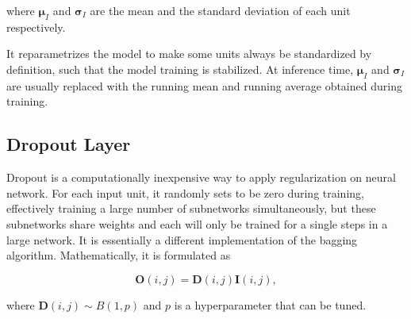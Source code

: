 \documentclass[]{interact}
\theoremstyle{plain}%
\theoremstyle{definition}
\theoremstyle{remark}
\begin{document}
where \(\boldsymbol{\mu}_I\) and \(\boldsymbol{\sigma}_I\) are the mean
and the standard deviation of each unit respectively.

It reparametrizes the model to make some units always be standardized by
definition, such that the model training is stabilized. At inference
time, \(\boldsymbol{\mu}_I\) and \(\boldsymbol{\sigma}_I\) are usually
replaced with the running mean and running average obtained during
training.

\subsection{Dropout Layer}\label{dropout-layer}

Dropout is a computationally inexpensive way to apply regularization on
neural network. For each input unit, it randomly sets to be zero during
training, effectively training a large number of subnetworks
simultaneously, but these subnetworks share weights and each will only
be trained for a single steps in a large network. It is essentially a
different implementation of the bagging algorithm. Mathematically, it is
formulated as

\[\boldsymbol{O}(i,j) = \boldsymbol{D}(i,j)\boldsymbol{I}(i,j),\]

where \(\boldsymbol{D}(i,j) \sim B(1, p)\) and \(p\) is a hyperparameter
that can be tuned.



\end{document}
